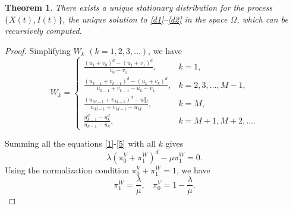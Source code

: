 \documentclass[12pt]{article}
\newtheorem{theorem}{Theorem}[section]
\newcommand{\blue}[1]{\textcolor{blue}{#1}}
\begin{document}
%
\begin{theorem}\label{fixed point}
There exists a unique stationary distribution for the process $\{X(t),I(t)\}$, the unique solution to \eqref{d1}--\eqref{d2} in the space $\Omega$, which can be recursively computed.
\end{theorem}

\begin{proof}
Simplifying $W_k$ $(k=1,2,3,\ldots)$, we have
\[W_k=\left\{\begin{array}{ll}
               \displaystyle \frac{(u_1+v_0)^d-(u_1+v_1)^d}{v_0-v_1}, & k=1, \\[4mm]
               \displaystyle \frac{(u_{k-1}+v_{k-1})^d-(u_k+v_k)^d}{u_{k-1}+v_{k-1}-u_k-v_k}, & k=2,3,\ldots,M-1, \\[4mm]
               \displaystyle \frac{(u_{M-1}+v_{M-1})^d-u_M^d}{u_{M-1}+v_{M-1}-u_M},& k=M, \\[4mm]
               \displaystyle \frac{u_{k-1}^d-u_k^d}{u_{k-1}-u_k}, & k=M+1,M+2,\ldots.
             \end{array}
\right.
\]

Summing all the equations \eqref{1}-\eqref{5} with all $k$ gives
       \[\lambda(\pi_{0}^{V}+\pi_{1}^{W})^d-\mu \pi_{1}^{W}=0.\]
Using the normalization condition $\pi_{0}^{V}+\pi_{1}^{W}=1$, we have
\[\pi_{1}^{W} =\frac{\lambda}{\mu},~~~~\pi_{0}^{V} = 1- \frac{\lambda}{\mu}.\]


\end{proof}
\end{document}
